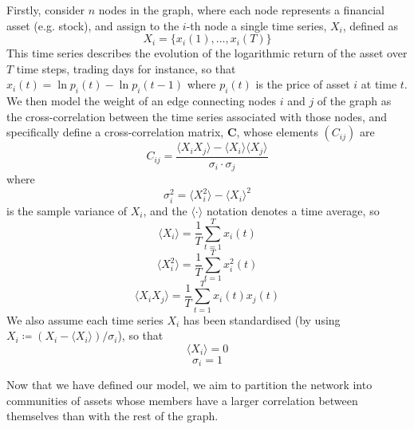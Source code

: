 \documentclass[12pt]{article}
\numberwithin{equation}{section}
\newcommand*\mean[1]{\langle#1\rangle}
\begin{document}
Firstly, consider $n$ nodes in the graph, where each node represents a financial asset (e.g. stock), and assign to the $i$-th node a single time series, $X_{i}$, defined as
\begin{equation}
\label{eq:singleTimeSeries}
	X_{i} = \{x_{i}(1),\dots,x_{i}(T)\}
\end{equation}
This time series describes the evolution of the logarithmic return of the asset over $T$ time steps, trading days for instance, so that $x_{i}(t) = \ln p_{i}(t) - \ln p_{i}(t-1)$ where $p_{i}(t)$ is the price of asset $i$ at time $t$. We then model the weight of an edge connecting nodes $i$ and $j$ of the graph as the cross-correlation between the time series associated with those nodes, and specifically define a cross-correlation matrix, $\mathbf{C}$, whose elements $(C_{ij})$ are
\begin{equation}
\label{eq:crossCorrelationMatrix}
	C_{ij} = \frac{\mean{X_{i} X_{j}} - \mean{X_{i}} \mean{X_{j}}}{\sigma_{i} \cdot \sigma_{j}}
\end{equation}
where
\begin{equation}
\label{eq:temporalVariance}
	\sigma_{i}^{2} = \mean{X_{i}^{2}} - \mean{X_{i}}^{2}
\end{equation}
is the sample variance of $X_{i}$, and the $\mean{\cdot}$ notation denotes a time average, so
\begin{equation}
\label{eq:temporalMean}
	\mean{X_{i}} = \frac{1}{T} \sum_{t=1}^{T} x_{i}(t)
\end{equation}
\begin{equation}
\label{eq:temporalMeanSquare}
	\mean{X_{i}^{2}} = \frac{1}{T} \sum_{t=1}^{T} x_{i}^{2}(t)
\end{equation}
\begin{equation}
\label{eq:temporalMeanProduct}
	\mean{X_{i}X_{j}} = \frac{1}{T} \sum_{t=1}^{T} x_{i}(t)x_{j}(t)
\end{equation}
We also assume each time series $X_{i}$ has been standardised (by using $X_{i} \coloneqq (X_{i} - \mean{X_{i}}) / \sigma_{i}$), so that
\begin{equation}
\label{eq:zeroTemporalMean}
	\mean{X_{i}} = 0
\end{equation}
\begin{equation}
\label{eq:unitTemporalVariance}
	\sigma_{i} = 1
\end{equation}

Now that we have defined our model, we aim to partition the network into communities of assets whose members have a larger correlation between themselves than with the rest of the graph.
\end{document}
